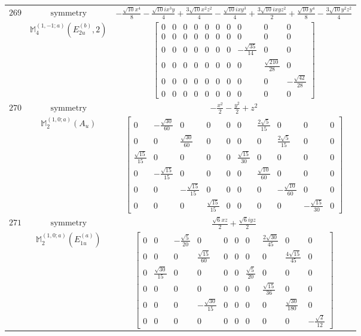 \documentclass[fleqn,8pt,landscape]{jsarticle}
\begin{document}
\begin{longtable}{ccc}
$ 269 $ & $ \text{symmetry} $ & $ - \frac{\sqrt{10} x^{4}}{8} - \frac{\sqrt{10} i x^{3} y}{4} + \frac{3 \sqrt{10} x^{2} z^{2}}{4} - \frac{\sqrt{10} i x y^{3}}{4} + \frac{3 \sqrt{10} i x y z^{2}}{2} + \frac{\sqrt{10} y^{4}}{8} - \frac{3 \sqrt{10} y^{2} z^{2}}{4} $ \\
$  $ & $ \mathbb{M}_{4}^{(1,-1;a)}(E_{2u}^{(b)},2) $ & $ \begin{bmatrix} 0 & 0 & 0 & 0 & 0 & 0 & 0 & 0 & 0 & 0 \\ 0 & 0 & 0 & 0 & 0 & 0 & 0 & 0 & 0 & 0 \\ 0 & 0 & 0 & 0 & 0 & 0 & 0 & - \frac{\sqrt{35}}{14} & 0 & 0 \\ 0 & 0 & 0 & 0 & 0 & 0 & 0 & 0 & \frac{\sqrt{210}}{28} & 0 \\ 0 & 0 & 0 & 0 & 0 & 0 & 0 & 0 & 0 & - \frac{\sqrt{42}}{28} \\ 0 & 0 & 0 & 0 & 0 & 0 & 0 & 0 & 0 & 0 \end{bmatrix} $ \\ \hline
$ 270 $ & $ \text{symmetry} $ & $ - \frac{x^{2}}{2} - \frac{y^{2}}{2} + z^{2} $ \\
$  $ & $ \mathbb{M}_{2}^{(1,0;a)}(A_{u}) $ & $ \begin{bmatrix} 0 & - \frac{\sqrt{30}}{60} & 0 & 0 & 0 & 0 & \frac{2 \sqrt{5}}{15} & 0 & 0 & 0 \\ 0 & 0 & \frac{\sqrt{30}}{60} & 0 & 0 & 0 & 0 & \frac{2 \sqrt{5}}{15} & 0 & 0 \\ \frac{\sqrt{15}}{15} & 0 & 0 & 0 & 0 & \frac{\sqrt{15}}{30} & 0 & 0 & 0 & 0 \\ 0 & - \frac{\sqrt{15}}{15} & 0 & 0 & 0 & 0 & \frac{\sqrt{10}}{60} & 0 & 0 & 0 \\ 0 & 0 & - \frac{\sqrt{15}}{15} & 0 & 0 & 0 & 0 & - \frac{\sqrt{10}}{60} & 0 & 0 \\ 0 & 0 & 0 & \frac{\sqrt{15}}{15} & 0 & 0 & 0 & 0 & - \frac{\sqrt{15}}{30} & 0 \end{bmatrix} $ \\ \hline
$ 271 $ & $ \text{symmetry} $ & $ \frac{\sqrt{6} x z}{2} + \frac{\sqrt{6} i y z}{2} $ \\
$  $ & $ \mathbb{M}_{2}^{(1,0;a)}(E_{1u}^{(a)}) $ & $ \begin{bmatrix} 0 & 0 & - \frac{\sqrt{5}}{20} & 0 & 0 & 0 & 0 & \frac{2 \sqrt{30}}{45} & 0 & 0 \\ 0 & 0 & 0 & \frac{\sqrt{15}}{60} & 0 & 0 & 0 & 0 & \frac{4 \sqrt{15}}{45} & 0 \\ 0 & \frac{\sqrt{30}}{15} & 0 & 0 & 0 & 0 & \frac{\sqrt{5}}{20} & 0 & 0 & 0 \\ 0 & 0 & 0 & 0 & 0 & 0 & 0 & \frac{\sqrt{15}}{36} & 0 & 0 \\ 0 & 0 & 0 & - \frac{\sqrt{30}}{15} & 0 & 0 & 0 & 0 & \frac{\sqrt{30}}{180} & 0 \\ 0 & 0 & 0 & 0 & 0 & 0 & 0 & 0 & 0 & - \frac{\sqrt{2}}{12} \end{bmatrix} $ \\ \hline

\end{longtable}
\end{document}
